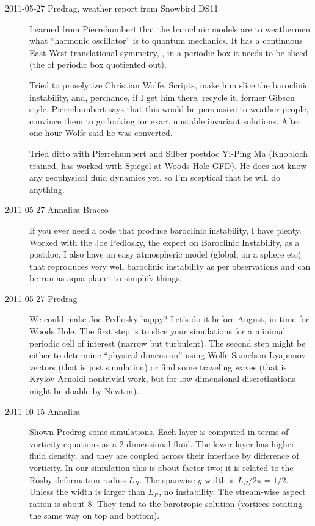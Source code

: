 \begin{description}

\item[2011-05-27 Predrag, weather report from Snowbird DS11]
	\toCB
Learned from Pierrehumbert that the baroclinic models are to weathermen
what ``harmonic oscillator'' is to quantum mechanics. It has a continuous
East-West translational symmetry, \ie, in a periodic box it needs to be
sliced (the  of periodic box quotiented out).

Tried to proselytize Christian Wolfe, Scripts,  make him slice
the baroclinic instability, and, perchance, if I get him there, recycle
it, former Gibson style. Pierrehumbert says that this would be persuasive
to weather people, convince them to go looking for exact unstable
invariant solutions. After one hour Wolfe said he was converted.

Tried ditto with Pierrehumbert and Silber postdoc Yi-Ping Ma (Knobloch
trained, has worked with Spiegel at Woods Hole GFD). He does not know any
geophysical fluid dynamics yet, so I'm sceptical that he will do anything.

\item[2011-05-27 Annalisa Bracco]
If you ever need a code that produce baroclinic instability, I have
plenty. Worked with the Joe Pedlosky, the expert on Baroclinic
Instability, as a postdoc. I also have an easy atmospheric model (global,
on a sphere etc) that reproduces very well baroclinic instability as per
observations and can be run as aqua-planet to simplify things.

\item[2011-05-27 Predrag]
We could make Joe Pedlosky happy? Let's do it before August, in time for
Woods Hole. The first step is to slice your simulations for a minimal
periodic cell of interest (narrow but turbulent). The second step might
be either to determine ``physical dimension'' using
Wolfe-Samelson Lyapunov vectors (that is just simulation) or
find some traveling waves (that is Krylov-Arnoldi nontrivial work, but
for low-dimensional discretizations might be doable by Newton).

\item[2011-10-15 Annalisa]
Shown Predrag some simulations.
Each layer is computed in
terms of vorticity equations as a 2-dimensional fluid. The lower layer
has higher fluid density, and they are coupled across their interface by
difference of vorticity.
In our simulation this is about factor two; it is related to the
R\"osby deformation radius $L_R$. The spanwise $y$ width is $L_R/2\pi =
1/2$. Unless the width is larger than $L_R$, no instability. The
stream-wise aspect ration is about 8.
They tend to the barotropic solution (vortices rotating the same way on
top and bottom).



\end{description}
